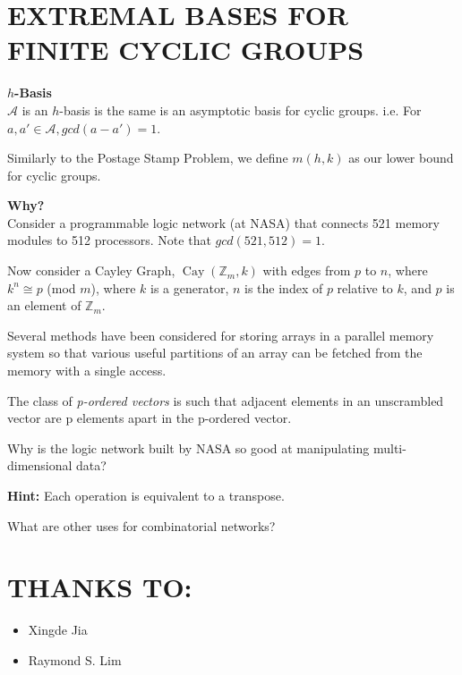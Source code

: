 \documentclass[a4paper,10pt,english]{sphinxhowto}
\def\A{{\mathcal A}}
\begin{document}
\newpage

\section*{EXTREMAL BASES FOR FINITE CYCLIC GROUPS}
\label{index:cyclic-groups}

\textbf{$h$-Basis}\\
$\A$ is an $h$-basis is the same is an asymptotic basis for cyclic groups.
i.e. For $a, a' \in \A, gcd(a - a') = 1$.

Similarly to the Postage Stamp Problem, we define $m(h, k)$ as our lower bound for cyclic groups.

\textbf{Why?}\\
Consider a programmable logic network (at NASA) that connects 521 memory modules to 512 processors. Note that $gcd(521, 512) = 1$.

Now consider a Cayley Graph, $\operatorname{Cay}(\mathbb{Z}_{m}, k)$ with edges from $p$ to $n$, where $k^{n} \cong p$ (mod $m$), where $k$ is a generator, $n$ is the index of $p$ relative to $k$, and $p$ is an element of $\mathbb{Z}_{m}$.

Several methods have been considered for storing arrays in a parallel memory system so that various useful partitions of an array can be fetched from the memory with a single access.

The class of \emph{p-ordered vectors} is such that adjacent elements in an unscrambled vector are p elements apart in the p-ordered vector.

Why is the logic network built by NASA so good at manipulating multi-dimensional data?

\textbf{Hint:} Each operation is equivalent to a transpose.

What are other uses for combinatorial networks?

\newpage
\section*{THANKS TO:}
\label{index:thanks}

\begin{itemize}
\item {}Xingde Jia
\item {}Raymond S. Lim
\end{itemize}

\renewcommand{\indexname}{Index}
\printindex
\end{document}
